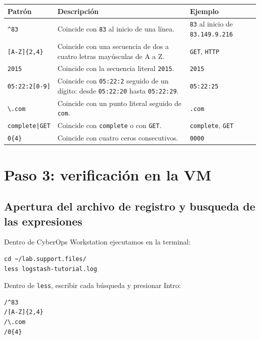 \documentclass[12pt,a4paper]{article}
\begin{document}
\begingroup
\small
\renewcommand{\arraystretch}{1.65}
\begin{tabular}{@{}p{3.3cm}>{\RaggedRight\arraybackslash}p{7cm}>{\RaggedRight\arraybackslash}p{4.3cm}@{}}
\toprule
\textbf{Patrón} & \textbf{Descripción} & \textbf{Ejemplo} \\
\midrule
\verb|^83| & Coincide con \texttt{83} al inicio de una línea. & \texttt{83} al inicio de \texttt{83.149.9.216} \\
\verb|[A-Z]{2,4}| & Coincide con una secuencia de dos a cuatro letras mayúsculas de A a Z. & \texttt{GET}, \texttt{HTTP} \\
\verb|2015| & Coincide con la secuencia literal \texttt{2015}. & \texttt{2015} \\
\verb|05:22:2[0-9]| & Coincide con \texttt{05:22:2} seguido de un dígito: desde \texttt{05:22:20} hasta \texttt{05:22:29}. & \texttt{05:22:25} \\
\verb|\.com| & Coincide con un punto literal seguido de \texttt{com}. & \texttt{.com} \\
\verb!complete|GET! & Coincide con \texttt{complete} o con \texttt{GET}. & \texttt{complete}, \texttt{GET} \\
\verb|0{4}| & Coincide con cuatro ceros consecutivos. & \texttt{0000} \\
\bottomrule
\end{tabular}
\endgroup

\newpage
\section{Paso 3: verificación en la VM}
\subsection{Apertura del archivo de registro y busqueda de las expresiones}
Dentro de CyberOps Workstation ejecutamos en la terminal:

\begin{verbatim}
cd ~/lab.support.files/
less logstash-tutorial.log
\end{verbatim}

Dentro de \texttt{less}, escribir cada búsqueda y presionar Intro:

\begin{verbatim}
/^83
/[A-Z]{2,4}
/\.com
/0{4}
\end{verbatim}
\end{document}
